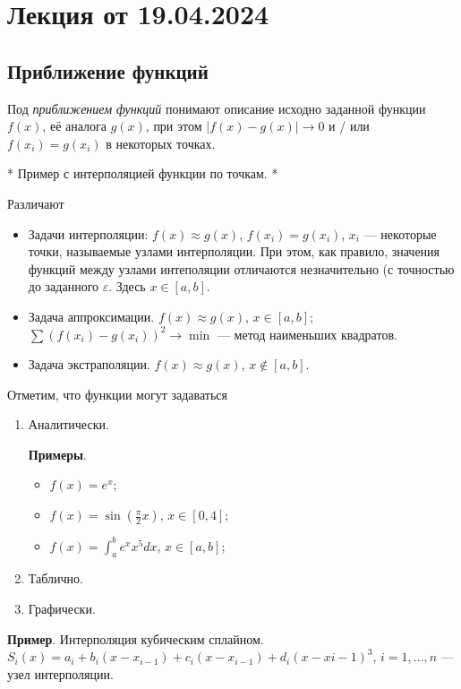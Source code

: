 \documentclass{article}
\begin{document}
\section{Лекция от 19.04.2024}

\subsection{Приближение функций}

Под \textit{приближением функций} понимают описание исходно заданной функции
$f(x)$, её аналога $g(x)$, при этом $|f(x) - g(x)| \to 0$ и / или $f(x_i) =
g(x_i)$ в некоторых точках.

* Пример с интерполяцией функции по точкам. *

Различают
\begin{itemize}
 \item Задачи интерполяции: $f(x) \approx g(x)$, $f(x_i) = g(x_i)$, $x_i$
    ---  некоторые точки, называемые узлами интерполяции. При этом, как правило,
    значения функций между узлами интеполяции отличаются незначительно (с
    точностью до заданного $\varepsilon$. Здесь $x \in [a, b]$.

  \item Задача аппроксимации. $f(x) \approx g(x)$, $x \in [a, b]$;
    $\sum(f(x_i) - g(x_i))^2 \to \min$ --- метод наименьших квадратов.

  \item Задача экстраполяции. $f(x) \approx g(x)$, $x \notin [a, b]$.
\end{itemize}

Отметим, что функции могут задаваться
\begin{enumerate}
  \item Аналитически.

    \textbf{Примеры}.
    \begin{itemize}
      \item $f(x) = e^x$;
      \item $f(x) = \sin(\frac{\pi}{2}x)$, $x \in [0, 4]$;
      \item $f(x) = \int_a^b e^x x^5 dx$, $x \in [a, b]$;
    \end{itemize}

  \item Таблично.

  \item Графически.
\end{enumerate}

\textbf{Пример}. Интерполяция кубическим сплайном.
$S_i(x) = a_i + b_i (x - x_{i - 1}) + c_i(x-x_{i-1}) + d_i(x-x{i-1})^3$,
$i = 1, ... ,n$ --- узел интерполяции.
\end{document}
